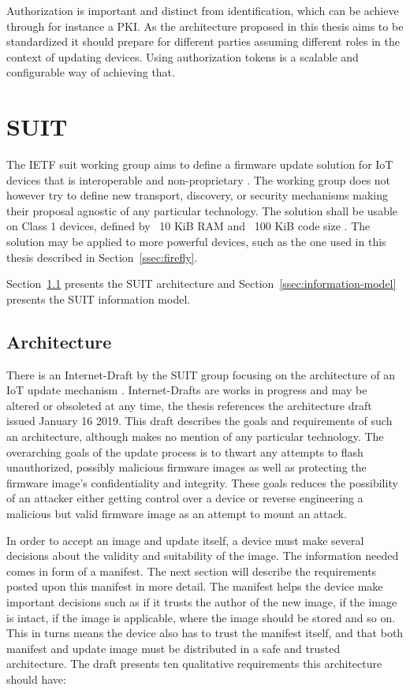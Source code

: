 \documentclass[0-thesis.tex]{subfiles}
\begin{document}
Authorization is important and distinct from identification, which can be achieve through
for instance a PKI. As the architecture proposed in this thesis aims to be standardized it
should prepare for different parties assuming different roles in the context of updating
devices. Using authorization tokens is a scalable and configurable way of achieving that.

\section{SUIT}
\label{sec:suit}
The IETF \acrfull{suit} working group aims to define a firmware update solution for IoT
devices that is interoperable and non-proprietary \parencite{suit}. The working group does
not however try to define new transport, discovery, or security mechanisms making their
proposal agnostic of any particular technology. The solution shall be usable on Class 1
devices, defined by ~10 KiB RAM and ~100 KiB code size \parencite{rfc7228}. The solution
may be applied to more powerful devices, such as the one used in this thesis described in
Section~\ref{ssec:firefly}.

Section~\ref{ssec:architecture} presents the SUIT architecture and
Section~\ref{ssec:information-model} presents the SUIT information model.

\subsection{Architecture}
\label{ssec:architecture}
There is an Internet-Draft by the SUIT group focusing on the architecture of an IoT update
mechanism \parencite{suit-architecture}. Internet-Drafts are works in progress and may be
altered or obsoleted at any time, the thesis references the architecture draft issued
January 16 2019. This draft describes the goals and requirements of such an architecture,
although makes no mention of any particular technology. The overarching goals of the
update process is to thwart any attempts to flash unauthorized, possibly malicious
firmware images as well as protecting the firmware image's confidentiality and integrity.
These goals reduces the possibility of an attacker either getting control over a device or
reverse engineering a malicious but valid firmware image as an attempt to mount an attack.

In order to accept an image and update itself, a device must make several decisions about
the validity and suitability of the image. The information needed comes in form of a
manifest. The next section will describe the requirements posted upon this manifest in
more detail. The manifest helps the device make important decisions such as if it trusts
the author of the new image, if the image is intact, if the image is applicable, where the
image should be stored and so on. This in turns means the device also has to trust the
manifest itself, and that both manifest and update image must be distributed in a safe and
trusted architecture. The draft \parencite{suit-architecture} presents ten qualitative
requirements this architecture should have:
\end{document}

